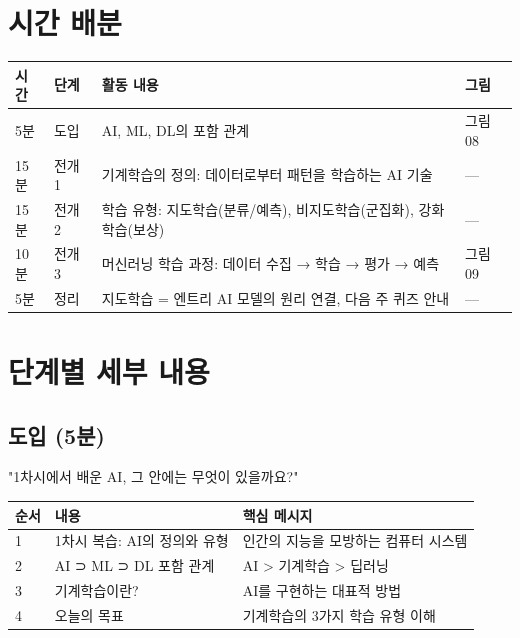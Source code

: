 \documentclass[11pt,a4paper]{article}
\begin{document}
\section{시간 배분}

\begin{center}
\begin{tabular}{C{1.5cm}C{2cm}L{8cm}C{2cm}}
\toprule
\textbf{시간} & \textbf{단계} & \textbf{활동 내용} & \textbf{그림} \\
\midrule
5분 & 도입 & AI, ML, DL의 포함 관계 & 그림 08 \\
15분 & 전개 1 & 기계학습의 정의: 데이터로부터 패턴을 학습하는 AI 기술 & — \\
15분 & 전개 2 & 학습 유형: 지도학습(분류/예측), 비지도학습(군집화), 강화학습(보상) & — \\
10분 & 전개 3 & 머신러닝 학습 과정: 데이터 수집 → 학습 → 평가 → 예측 & 그림 09 \\
5분 & 정리 & 지도학습 = 엔트리 AI 모델의 원리 연결, 다음 주 퀴즈 안내 & — \\
\bottomrule
\end{tabular}
\end{center}

\section{단계별 세부 내용}

\subsection{ 도입 (5분)}

\begin{infobox}
"1차시에서 배운 AI, 그 안에는 무엇이 있을까요?"
\end{infobox}

\begin{center}
\begin{tabular}{C{1cm}L{5.5cm}L{6.5cm}}
\toprule
\textbf{순서} & \textbf{내용} & \textbf{핵심 메시지} \\
 & 1차시 복습: AI의 정의와 유형 & 인간의 지능을 모방하는 컴퓨터 시스템 \\
2 & AI ⊃ ML ⊃ DL 포함 관계 & AI > 기계학습 > 딥러닝 \\
3 & 기계학습이란? & AI를 구현하는 대표적 방법 \\
4 & 오늘의 목표 & 기계학습의 3가지 학습 유형 이해 \\
\bottomrule
\end{tabular}
\end{center}
\end{document}
